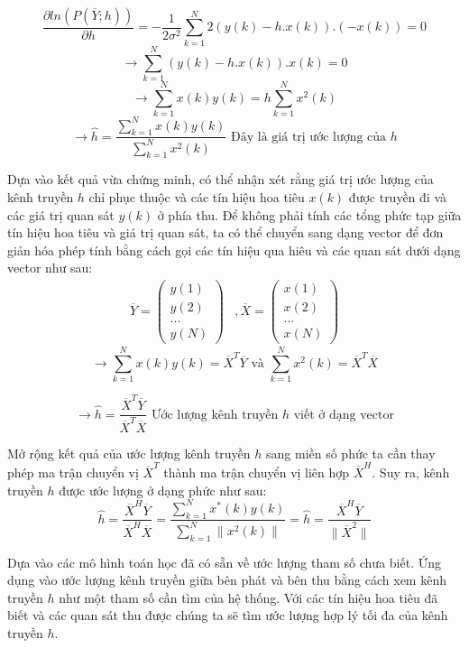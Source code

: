 \documentclass{article}
\begin{document}
$$\frac{\partial ln(P(\overline{Y};h))}{\partial h} = -\frac{1}{2\sigma^2} \sum_{k=1}^{N} 2(y(k) - h.x(k)).(-x(k)) = 0$$
$$ \rightarrow \sum_{k=1}^{N} (y(k) - h.x(k)).x(k) = 0$$
$$\rightarrow \sum_{k=1}^{N} x(k)y(k) = h\sum_{k=1}^{N} x^2(k)$$
$$\rightarrow \hat{h} = \frac{\sum_{k=1}^{N} x(k)y(k)}{\sum_{k=1}^{N} x^2(k)} \text{ Đây là giá trị ước lượng của }h$$

Dựa vào kết quả vừa chứng minh, có thể nhận xét rằng giá trị ước lượng của kênh truyền $h$ chỉ phục thuộc và các tín hiệu hoa tiêu $x(k)$ được truyền đi và các giá trị quan sát $y(k)$ ở phía thu. Để không phải tính các tổng phức tạp giữa tín hiệu hoa tiêu và giá trị quan sát, ta có thể chuyển sang dạng vector để đơn giản hóa phép tính bằng cách gọi các tín hiệu qua hiêu và các quan sát dưới dạng vector như sau:
\[ 
\begin{array}{cc}
\overline{Y} = \begin{pmatrix}
y(1) \\
y(2) \\
...\\
y(N)
\end{pmatrix} & , 
\overline{X} = \begin{pmatrix}
x(1) \\
x(2)\\
...\\
x(N)
\end{pmatrix}
\end{array}
\]
$$\rightarrow \sum_{k=1}^{N} x(k)y(k) = \overline{X}^T \overline{Y} \text{ và } \sum_{k=1}^{N} x^2(k) = \overline{X}^T \overline{X} $$

$$\rightarrow \hat{h} =\frac{\overline{X}^T \overline{Y}}{\overline{X}^T \overline{X}} \text{ Ước lượng kênh truyền } h \text{ viết ở dạng vector}$$

Mở rộng kết quả của ước lượng kênh truyền $h$ sang miền số phức ta cần thay phép ma trận chuyển vị $\overline{X}^T$ thành ma trận chuyển vị liên hợp $\overline{X}^H$. Suy ra, kênh truyền $h$ được ước lượng ở dạng phức như sau:
$$ \hat{h} = \frac{\overline{X}^H \overline{Y}}{\overline{X}^H \overline{X}} =\frac{\sum_{k=1}^{N} x^{*}(k)y(k)}{\sum_{k=1}^{N} \|x^2(k)\|} = \hat{h} = \frac{\overline{X}^H \overline{Y}}{\| \overline{X} ^2 \|}$$

Dựa vào các mô hình toán học đã có sẵn về ước lượng tham số chưa biết. Ứng dụng vào ước lượng kênh truyền giữa bên phát và bên thu bằng cách xem kênh truyền $h$ như một tham số cần tìm của hệ thống. Với các tín hiệu hoa tiêu đã biết và các quan sát thu được chúng ta sẽ tìm ước lượng hợp lý tối đa của kênh truyền $h$.
\end{document}
